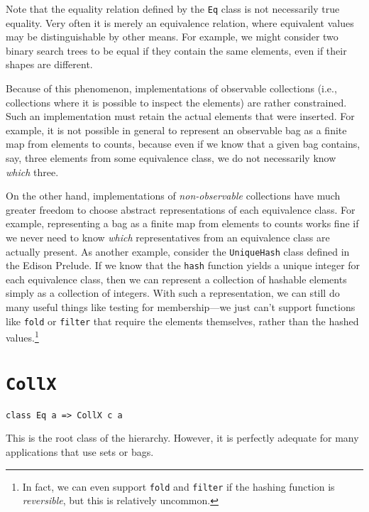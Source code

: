 \documentclass{report}
\newcommand{\cd}{\texttt}
\begin{document}
Note that the equality relation defined by the \cd{Eq} class
is not necessarily true equality.  Very often it is merely
an equivalence relation, where equivalent values may be distinguishable
by other means.  For example, we might consider two binary search trees
to be equal if they contain the same elements, even if their shapes
are different.  

Because of this phenomenon, implementations of observable collections 
(i.e., collections where it is possible to inspect the elements) are
rather constrained.  Such an implementation must retain the actual
elements that were inserted.  For example, it is not possible
in general to represent an observable bag as a finite map from elements
to counts, because even if we know that a given bag contains, say, three
elements from some equivalence class, we do not necessarily know \emph{which}
three.

On the other hand, implementations of \emph{non-observable} collections
have much greater freedom to choose abstract representations of
each equivalence class.  For example, representing a bag as a finite
map from elements to counts works fine if we never need to know
\emph{which} representatives from an equivalence class are actually
present.  As another example, consider the \cd{UniqueHash} class
defined in the Edison Prelude.  If we know that the \cd{hash} function
yields a unique integer for each equivalence class, then we can
represent a collection of hashable elements simply as a collection
of integers.  With such a representation, we can still do many
useful things like testing for membership---we just can't support functions
like \cd{fold} or \cd{filter} that require the elements themselves,
rather than the hashed values.\footnote{In fact, we can even
support \cd{fold} and \cd{filter} if the hashing function is \emph{reversible},
but this is relatively uncommon.}

\section{\cd{CollX}}
\begin{verbatim}
class Eq a => CollX c a
\end{verbatim}
%
This is the root class of the hierarchy.  However, it is perfectly
adequate for many applications that use sets or bags.
\end{document}
